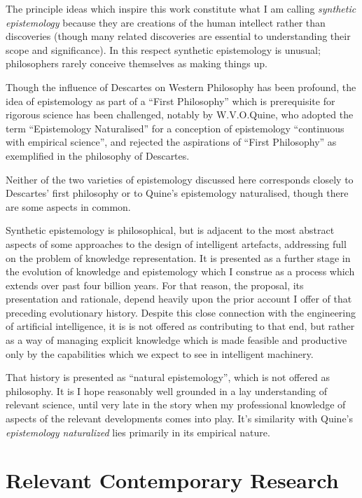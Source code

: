 \documentclass[10pt,titlepage]{book}
\begin{document}
The principle ideas which inspire this work constitute what I am calling \emph{synthetic epistemology} because they are creations of the human intellect rather than discoveries (though many related discoveries are essential to understanding their scope and significance).
In this respect synthetic epistemology is unusual; philosophers rarely conceive themselves as making things up.

Though the influence of Descartes on Western Philosophy has been profound, the idea of epistemology as part of a ``First Philosophy'' which is prerequisite for rigorous science has been challenged, notably by W.V.O.Quine, who adopted the term ``Epistemology Naturalised'' for a conception of epistemology ``continuous with empirical science'', and rejected the aspirations of ``First Philosophy'' as exemplified in the philosophy of Descartes.

Neither of the two varieties of epistemology discussed here corresponds closely to Descartes' first philosophy or to Quine's epistemology naturalised, though there are some aspects in common.

Synthetic epistemology is philosophical, but is adjacent to the most abstract aspects of some approaches to the design of intelligent artefacts, addressing full on the problem of knowledge representation.
It is presented as a further stage in the evolution of knowledge and epistemology which I construe as a process which extends over past four billion years.
For that reason, the proposal, its presentation and rationale, depend heavily upon the prior account I offer of that preceding evolutionary history.
Despite this close connection with the engineering of artificial intelligence, it is is not offered as contributing to that end, but rather as a way of managing explicit knowledge which is made feasible and productive only by the capabilities which we expect to see in intelligent machinery.

That history is presented as ``natural epistemology'', which is not offered as philosophy.
It is I hope reasonably well grounded in a lay understanding of relevant science, until very late in the story when my professional knowledge of aspects of the relevant developments comes into play.  
It's similarity with Quine's \emph{epistemology naturalized} lies primarily in its empirical nature.

\chapter{Relevant Contemporary Research}
\end{document}
